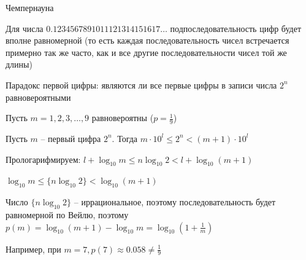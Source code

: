 \begin{MyTheorem}
    \Ths Чемпернауна

    Для числа $0.1234567891011121314151617\dots$ подпоследовательность цифр будет вполне равномерной (то есть каждая последовательность чисел встречается примерно так же часто, как и все другие последовательности чисел той же длины)
\end{MyTheorem}

Парадокс первой цифры: являются ли все первые цифры в записи числа $2^n$ равновероятными

Пусть $m = 1, 2, 3, \dots, 9$ равновероятны ($p = \frac{1}{9}$)

Пусть $m$ -- первый цифра $2^n$. Тогда $m \cdot 10^l \leq 2^n < (m + 1) \cdot 10^l$

Прологарифмируем: $l + \log_{10} m \leq n \log_{10} 2 < l + \log_{10} (m + 1)$

$\log_{10} m \leq \{n \log_{10} 2\} < \log_{10} (m + 1)$

Число $\{n \log_{10} 2\}$ -- иррациональное, поэтому последовательность будет равномерной по Вейлю, поэтому $p(m) = \log_{10} (m + 1) - \log_{10} m = \log_{10} \left(1 + \frac{1}{m}\right)$

Например, при $m = 7, p(7) \approx 0.058 \neq \frac{1}{9}$

